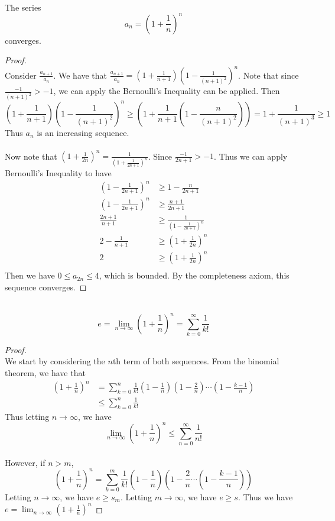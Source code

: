 \documentclass[a4paper]{article}
\begin{document}
\begin{lmm}{}{}\\ The series $$a_n=\left(1+\frac{1}{n}\right)^n$$ converges. 
\begin{proof}\\ Consider $\frac{a_{n+1}}{a_n}$. We have that $\frac{a_{n+1}}{a_n}=\left(1+\frac{1}{n+1}\right)\left(1-\frac{1}{(n+1)^2}\right)^n$. Note that since $\frac{-1}{(n+1)^2}>-1$, we can apply the Bernoulli's Inequality can be applied. Then $$\left(1+\frac{1}{n+1}\right)\left(1-\frac{1}{(n+1)^2}\right)^n\geq\left(1+\frac{1}{n+1}\left(1-\frac{n}{(n+1)^2}\right)\right)=1+\frac{1}{(n+1)^3}\geq 1$$ Thus $a_n$ is an increasing sequence. 
\\~\\ Now note that $\left(1+\frac{1}{2n}\right)^n=\frac{1}{\left(1+\frac{1}{2n+1}\right)^n}$. Since $\frac{-1}{2n+1}>-1$. Thus we can apply Bernoulli's Inequality to have 
\begin{align*}
\left(1-\frac{1}{2n+1}\right)^n&\geq1-\frac{n}{2n+1} \\
\left(1-\frac{1}{2n+1}\right)^n&\geq\frac{n+1}{2n+1} \\
\frac{2n+1}{n+1}&\geq\frac{1}{\left(1-\frac{1}{2n+1}\right)^n} \\
2-\frac{1}{n+1}&\geq\left(1+\frac{1}{2n}\right)^n \\
2&\geq\left(1+\frac{1}{2n}\right)^n \\
\end{align*}
Then we have $0\leq a_{2n}\leq 4$, which is bounded. By the completeness axiom, this sequence converges. 
\end{proof}
\end{lmm}

\begin{prp}{}{}\\ $$e=\lim_{n\to\infty}\left(1+\frac{1}{n}\right)^n=\sum_{k=0}^{\infty}\frac{1}{k!}$$ 
\begin{proof}\\ We start by considering the $n$th term of both sequences. From the binomial theorem, we have that
\begin{align*}
\left(1+\frac{1}{n}\right)^n&=\sum_{k=0}^{n}\frac{1}{k!}\left(1-\frac{1}{n}\right)\left(1-\frac{2}{n}\right)\cdots\left(1-\frac{k-1}{n}\right)\\
&\leq\sum_{k=0}^{n}\frac{1}{k!}
\end{align*} Thus letting $n\to\infty$, we have $$\lim_{n\to\infty}\left(1+\frac{1}{n}\right)^n\leq\sum_{n=0}^{\infty}\frac{1}{n!}$$\\
However, if $n>m$, $$\left(1+\frac{1}{n}\right)^n=\sum_{k=0}^{m}\frac{1}{k!}\left(1-\frac{1}{n}\right)\left(1-\frac{2}{n}\cdots\left(1-\frac{k-1}{n}\right)\right)$$ Letting $n\to\infty$, we have $e\geq s_m$. Letting $m\to\infty$, we have $e\geq s$. Thus we have $e=\lim_{n\to\infty}\left(1+\frac{1}{n}\right)^n$
\end{proof}
\end{prp}
\end{document}
